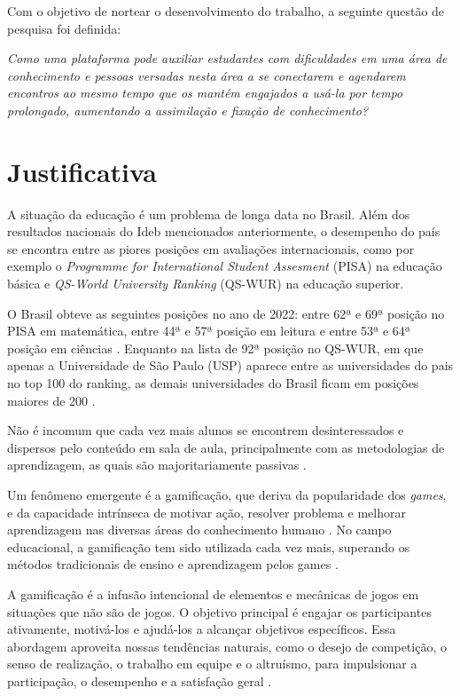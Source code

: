Com o objetivo de nortear o desenvolvimento do trabalho, a seguinte questão de
pesquisa foi definida:

\textit{Como uma plataforma pode auxiliar estudantes com dificuldades em uma área de conhecimento e pessoas versadas nesta área a se conectarem e agendarem encontros ao mesmo tempo que os mantém engajados a usá-la por tempo prolongado, aumentando a assimilação e fixação de conhecimento?}

\section[Justificativa]{Justificativa}
\label{sec:justificativa}

A situação da educação é um problema de longa data no Brasil. Além dos resultados nacionais do Ideb mencionados anteriormente, o desempenho do país se encontra entre as piores posições em avaliações internacionais, como por exemplo o \textit{Programme for International Student Assesment} (PISA) na educação básica e \textit{QS-World University Ranking} (QS-WUR) na educação superior.

O Brasil obteve as seguintes posições no ano de 2022: entre 62ª e 69ª posição no PISA em matemática, entre 44ª e 57ª posição em leitura e entre 53ª e 64ª posição em ciências \cite{pisa2024}.
Enquanto na lista de 92ª posição  no QS-WUR, em que apenas a Universidade de São Paulo (USP) aparece entre as universidades do pais no top 100 do ranking, as demais universidades do Brasil ficam em posições maiores de 200 \cite{qswur2025}.

Não é incomum que cada vez mais alunos se encontrem desinteressados e dispersos pelo conteúdo em sala de aula, principalmente com as metodologias de aprendizagem, as quais são majoritariamente passivas \cite{fragelli2017game}.

Um fenômeno emergente é a gamificação, que deriva da popularidade dos \textit{games}, e da capacidade intrínseca de motivar ação, resolver problema e melhorar aprendizagem nas diversas áreas do conhecimento humano \cite{fardo2013gamificacao}.
No campo educacional, a gamificação tem sido utilizada cada vez mais, superando
os métodos tradicionais de ensino e aprendizagem pelos games \cite{souza2025metodologias}.

A gamificação é a infusão intencional de elementos e mecânicas de jogos em situações que não são de jogos. O objetivo principal é engajar os participantes ativamente, motivá-los e ajudá-los a alcançar objetivos específicos. Essa abordagem aproveita nossas tendências naturais, como o desejo de competição, o senso de realização, o trabalho em equipe e o altruísmo, para impulsionar a participação, o desempenho e a satisfação geral \cite{magtani2024design}.

